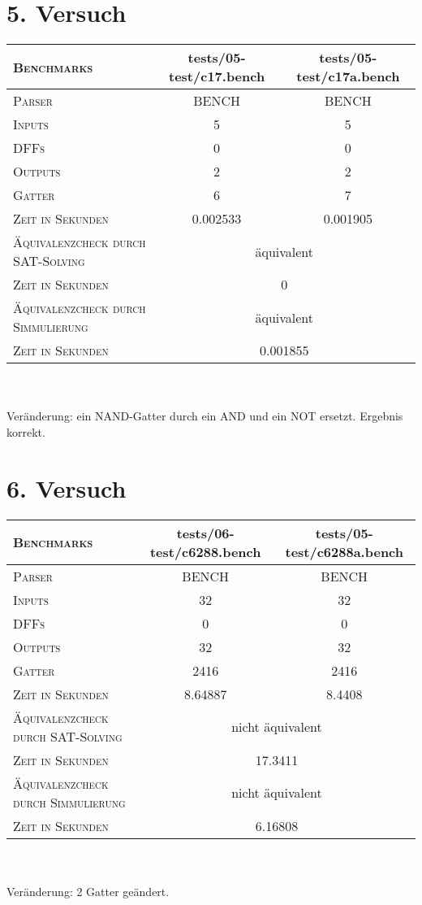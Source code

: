 \section{5. Versuch}

\begin{tabular}{|l|c|c|}
	\hline
	\textsc{Benchmarks} & tests/05-test/c17.bench & tests/05-test/c17a.bench \\
	\hline
	\hline
	\textsc{Parser} & BENCH & BENCH \\
	\hline
	\textsc{Inputs} & 5 & 5 \\
	\hline
	\textsc{DFFs} & 0 & 0 \\
	\hline
	\textsc{Outputs} & 2 & 2 \\
	\hline
	\textsc{Gatter} & 6 & 7 \\		
	\hline
	\textsc{Zeit in Sekunden} & 0.002533 & 0.001905 \\ 
	\hline
	\hline
	\textsc{Äquivalenzcheck durch SAT-Solving} & \multicolumn{2}{|c|}{äquivalent} \\
	\hline
	\textsc{Zeit in Sekunden} & \multicolumn{2}{|c|}{0} \\
	\hline
	\hline
	\textsc{Äquivalenzcheck durch Simmulierung} & \multicolumn{2}{|c|}{äquivalent} \\
	\hline
	\textsc{Zeit in Sekunden} & \multicolumn{2}{|c|}{ 0.001855} \\
	\hline
\end{tabular} \\\\
Veränderung: ein NAND-Gatter durch ein AND und ein NOT ersetzt. Ergebnis korrekt.


\section{6. Versuch}

\begin{tabular}{|l|c|c|}
	\hline
	\textsc{Benchmarks} & tests/06-test/c6288.bench & tests/05-test/c6288a.bench \\
	\hline
	\hline
	\textsc{Parser} & BENCH & BENCH \\
	\hline
	\textsc{Inputs} & 32 & 32 \\
	\hline
	\textsc{DFFs} & 0 & 0 \\
	\hline
	\textsc{Outputs} & 32 & 32 \\
	\hline
	\textsc{Gatter} & 2416 & 2416 \\		
	\hline
	\textsc{Zeit in Sekunden} & 8.64887 & 8.4408 \\ 
	\hline
	\hline
	\textsc{Äquivalenzcheck durch SAT-Solving} & \multicolumn{2}{|c|}{nicht äquivalent} \\
	\hline
	\textsc{Zeit in Sekunden} & \multicolumn{2}{|c|}{17.3411} \\
	\hline
	\hline
	\textsc{Äquivalenzcheck durch Simmulierung} & \multicolumn{2}{|c|}{nicht äquivalent} \\
	\hline
	\textsc{Zeit in Sekunden} & \multicolumn{2}{|c|}{6.16808} \\
	\hline
\end{tabular} \\\\
Veränderung: 2 Gatter geändert. 
